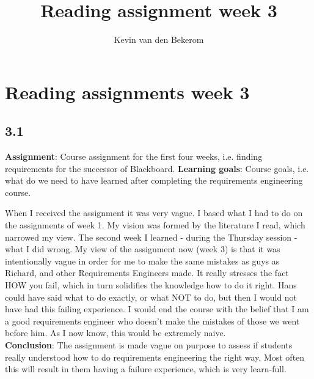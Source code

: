 

\title{Reading assignment week 3}
\newcommand{\TitelAbbr}{}
\newcommand{\Version}{0.1}



\what{}
\supervisors{}
\author{Kevin van den Bekerom}




\maketitle

\clearpage


\chapter*{Reading assignments week 3}

\section*{3.1}


\textbf{Assignment}: Course assignment for the first four weeks, i.e. finding requirements for the successor of Blackboard.
\textbf{Learning goals}: Course goals, i.e. what do we need to have learned after completing the requirements engineering course.

When I received the assignment it was very vague. I based what I had to do on the assignments of week 1. My vision was formed by the literature I read, which narrowed my view.
The second week I learned - during the Thursday session - what I did wrong. My view of the assignment now (week 3) is that it was intentionally vague in order for me to make
the same mistakes as guys as Richard, and other Requirements Engineers made. It really stresses the fact HOW you fail, which in turn solidifies the knowledge how to do it right.
Hans could have said what to do exactly, or what NOT to do, but then I would not have had this failing experience. I would end the course with the belief that I am a good requirements
engineer who doesn't make the mistakes of those we went before him. As I now know, this would be extremely naive. \\

\textbf{Conclusion}: The assignment is made vague on purpose to assess if students really understood how to do requirements engineering the right way. Most often this will result in them having a failure experience,
which is very learn-full. 


